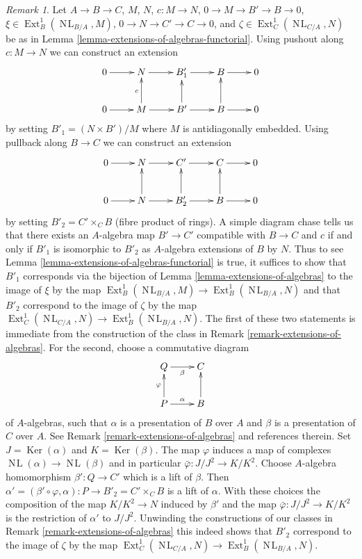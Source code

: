 \documentclass{stacks-project}
\theoremstyle{plain}
\theoremstyle{definition}
\theoremstyle{remark}
\newtheorem{remark}[subsection]{Remark}
\numberwithin{equation}{subsection}
\def\Ext{\mathop{\mathrm{Ext}}\nolimits}
\def\NL{\mathop{N\!L}\nolimits}
\def\Ker{\mathop{\mathrm{Ker}}}
\begin{document}
\begin{remark}
\label{remark-extensions-of-algebras-functorial}
Let $A \to B \to C$, $M$, $N$, $c : M \to N$,
$0 \to M \to B' \to B \to 0$, $\xi \in \Ext^1_B(\NL_{B/A}, M)$,
$0 \to N \to C' \to C \to 0$, and $\zeta \in \Ext^1_C(\NL_{C/A}, N)$ be as in
Lemma \ref{lemma-extensions-of-algebras-functorial}.
Using pushout along $c : M \to N$ we can construct an extension
$$
\xymatrix{
0 \ar[r] & N \ar[r] & B'_1 \ar[r] & B \ar[r] & 0 \\
0 \ar[r] & M \ar[u]^c \ar[r] & B' \ar[u] \ar[r] & B \ar[u] \ar[r] & 0
}
$$
by setting $B'_1 = (N \times B')/M$ where $M$ is antidiagonally
embedded. Using pullback along $B \to C$ we can construct an extension
$$
\xymatrix{
0 \ar[r] & N \ar[r] & C' \ar[r] & C \ar[r] & 0 \\
0 \ar[r] & N \ar[u] \ar[r] & B'_2 \ar[u] \ar[r] & B \ar[u] \ar[r] & 0
}
$$
by setting $B'_2 = C' \times_C B$ (fibre product of rings). A simple diagram
chase tells us that there exists an $A$-algebra map $B' \to C'$
compatible with $B \to C$ and $c$ if and only if $B'_1$ is isomorphic
to $B'_2$ as $A$-algebra extensions of $B$ by $N$. Thus to see
Lemma \ref{lemma-extensions-of-algebras-functorial}
is true, it suffices to show that $B'_1$ corresponds via the bijection of
Lemma \ref{lemma-extensions-of-algebras}
to the image of $\xi$ by the map
$\Ext^1_B(\NL_{B/A}, M) \to \Ext^1_B(\NL_{B/A}, N)$
and that $B'_2$ correspond to the image of $\zeta$ by the map
$\Ext^1_C(\NL_{C/A}, N) \to \Ext^1_B(\NL_{B/A}, N)$.
The first of these two statements is immediate from the construction
of the class in Remark \ref{remark-extensions-of-algebras}.
For the second, choose a commutative diagram
$$
\xymatrix{
Q \ar[r]_\beta & C \\
P \ar[u]^\varphi \ar[r]^\alpha & B \ar[u]
}
$$
of $A$-algebras, such that $\alpha$ is a presentation of $B$ over $A$
and $\beta$ is a presentation of $C$ over $A$. See
Remark \ref{remark-extensions-of-algebras} and references therein.
Set $J = \Ker(\alpha)$ and $K = \Ker(\beta)$. The map $\varphi$
induces a map of complexes $\NL(\alpha) \to \NL(\beta)$
and in particular $\bar\varphi : J/J^2 \to K/K^2$.
Choose $A$-algebra homomorphism $\beta' : Q \to C'$
which is a lift of $\beta$. Then
$\alpha' = (\beta' \circ \varphi, \alpha) : P \to B'_2 = C' \times_C B$
is a lift of $\alpha$. With these choices the composition of the map
$K/K^2 \to N$ induced by $\beta'$ and the map $\bar\varphi : J/J^2 \to K/K^2$
is the restriction of $\alpha'$ to $J/J^2$.
Unwinding the constructions of our classes in
Remark \ref{remark-extensions-of-algebras}
this indeed shows that
$B'_2$ correspond to the image of $\zeta$ by the map
$\Ext^1_C(\NL_{C/A}, N) \to \Ext^1_B(\NL_{B/A}, N)$.
\end{remark}
\end{document}
